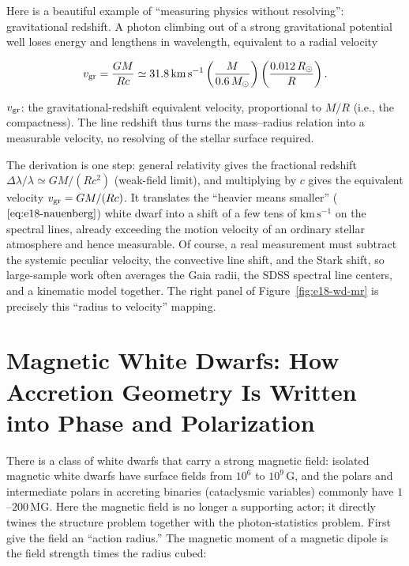 Here is a beautiful example of ``measuring physics without resolving'': gravitational redshift. A photon climbing out of a strong gravitational potential well loses energy and lengthens in wavelength, equivalent to a radial velocity

\begin{equation}
  v_{\rm gr}=\frac{GM}{Rc}
  \simeq 31.8\,\mathrm{km\,s^{-1}}
  \left(\frac{M}{0.6\,M_\odot}\right)
  \left(\frac{0.012\,R_\odot}{R}\right).
  \label{eq:e18-vgr}
\end{equation}
\begin{formulaexplain}
\(v_{\rm gr}\): the gravitational-redshift equivalent velocity, proportional to \(M/R\) (i.e., the compactness). The line redshift thus turns the mass--radius relation into a measurable velocity, no resolving of the stellar surface required.
\end{formulaexplain}

The derivation is one step: general relativity gives the fractional redshift \(\Delta\lambda/\lambda\simeq GM/(Rc^2)\) (weak-field limit), and multiplying by \(c\) gives the equivalent velocity \(v_{\rm gr}=GM/(Rc)\). It translates the ``heavier means smaller'' (\(\eqref{eq:e18-nauenberg}\)) white dwarf into a shift of a few tens of \(\mathrm{km\,s^{-1}}\) on the spectral lines, already exceeding the motion velocity of an ordinary stellar atmosphere and hence measurable. Of course, a real measurement must subtract the systemic peculiar velocity, the convective line shift, and the Stark shift, so large-sample work often averages the Gaia radii, the SDSS spectral line centers, and a kinematic model together. The right panel of Figure~\ref{fig:e18-wd-mr} is precisely this ``radius to velocity'' mapping.


\section{Magnetic White Dwarfs: How Accretion Geometry Is Written into Phase and Polarization}
\label{sec:e18-mcv}

There is a class of white dwarfs that carry a strong magnetic field: isolated magnetic white dwarfs have surface fields from \(10^6\) to \(10^9\,\mathrm{G}\), and the polars and intermediate polars in accreting binaries (cataclysmic variables) commonly have \(1\)--\(200\,\mathrm{MG}\). Here the magnetic field is no longer a supporting actor; it directly twines the structure problem together with the photon-statistics problem. First give the field an ``action radius.'' The magnetic moment of a magnetic dipole is the field strength times the radius cubed:

